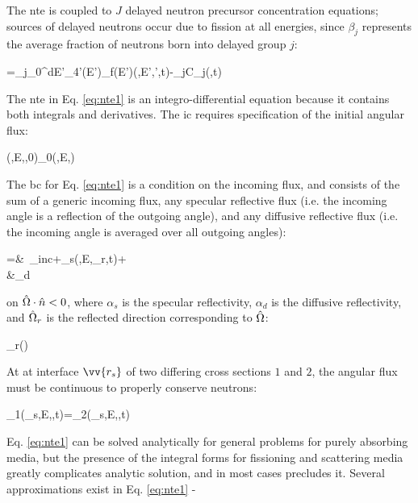 The \gls{nte} is coupled to \(J\) delayed neutron precursor concentration equations; sources of delayed neutrons occur due to fission at all energies, since \(\beta_j\) represents the average fraction of neutrons born into delayed group \(j\):

\beq
\label{eq:DelayedNeutrons}
=\beta_j\int_{0}^\infty dE'\int_{4\pi}\hO'\nu(E')\Sigma_f(E')\psi(,E',\hO',t)-\lambda_jC_j(,t)\hspace{1cm}
\eeq

The \gls{nte} in Eq. \eqref{eq:nte1} is an integro-differential equation because it contains both integrals and derivatives. The \gls{ic} requires specification of the initial angular flux:

\beq
\psi(,E,\hO,0)\equiv\psi_0(,E,\hO)
\eeq

The \gls{bc} for Eq. \eqref{eq:nte1} is a condition on the incoming flux, and consists of the sum of a generic incoming flux, any specular reflective flux (i.e. the incoming angle is a reflection of the outgoing angle), and any diffusive reflective flux (i.e. the incoming angle is averaged over all outgoing angles):

\beqa
\label{eq:NTEBCs}
\psi\seat=&\ \psi_{inc}\seat+\alpha_s\seat\psi(,E,\hO_r,t)+\\
&\hspace{1cm}\alpha_d\seat{}
\eeqa

on \(\hat{\Omega}\cdot\hat{n}<0\), where \(\alpha_s\) is the specular reflectivity, \(\alpha_d\) is the diffusive reflectivity, and \(\hat{\Omega}_r\) is the reflected direction corresponding to \(\hat{\Omega}\):

\beq
\label{eq:hOrDef}
\hO_r\equiv{}\left(\hO\cdot{}\right)
\eeq

At at interface \(\vv{r_s}\) of two differing cross sections \(1\) and \(2\), the angular flux must be continuous to properly conserve neutrons:

\beq
\label{eq:NTE_interface}
\psi_1(_s,E,\hO,t)=\psi_2(_s,E,\hO,t)
\eeq

Eq. \eqref{eq:nte1} can be solved analytically for general problems for purely absorbing media, but the presence of the integral forms for fissioning and scattering media greatly complicates analytic solution, and in most cases precludes it. Several approximations exist in Eq. \eqref{eq:nte1} -

